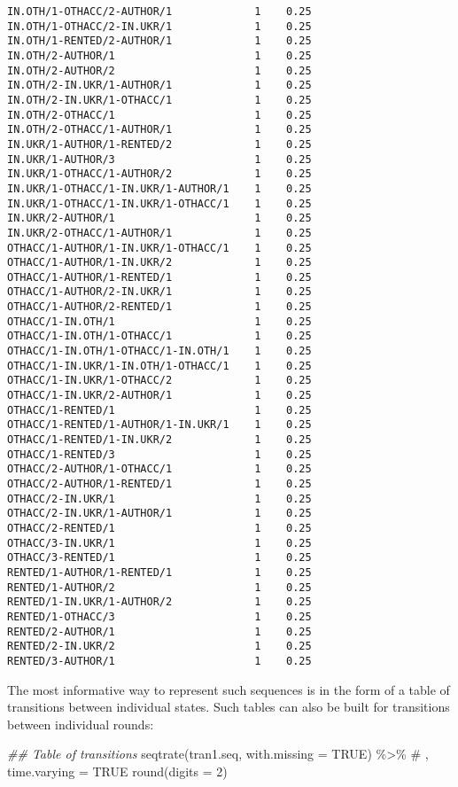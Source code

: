 \documentclass[
  letterpaper,
  DIV=11,
  numbers=noendperiod]{scrreprt}
\newenvironment{Shaded}{\begin{snugshade}}{\end{snugshade}}
\newcommand{\AttributeTok}[1]{\textcolor[rgb]{0.40,0.45,0.13}{#1}}
\newcommand{\CommentTok}[1]{\textcolor[rgb]{0.37,0.37,0.37}{#1}}
\newcommand{\ConstantTok}[1]{\textcolor[rgb]{0.56,0.35,0.01}{#1}}
\newcommand{\DecValTok}[1]{\textcolor[rgb]{0.68,0.00,0.00}{#1}}
\newcommand{\DocumentationTok}[1]{\textcolor[rgb]{0.37,0.37,0.37}{\textit{#1}}}
\newcommand{\FunctionTok}[1]{\textcolor[rgb]{0.28,0.35,0.67}{#1}}
\newcommand{\NormalTok}[1]{\textcolor[rgb]{0.00,0.23,0.31}{#1}}
\newcommand{\SpecialCharTok}[1]{\textcolor[rgb]{0.37,0.37,0.37}{#1}}
\begin{document}
\begin{verbatim}
IN.OTH/1-OTHACC/2-AUTHOR/1             1    0.25
IN.OTH/1-OTHACC/2-IN.UKR/1             1    0.25
IN.OTH/1-RENTED/2-AUTHOR/1             1    0.25
IN.OTH/2-AUTHOR/1                      1    0.25
IN.OTH/2-AUTHOR/2                      1    0.25
IN.OTH/2-IN.UKR/1-AUTHOR/1             1    0.25
IN.OTH/2-IN.UKR/1-OTHACC/1             1    0.25
IN.OTH/2-OTHACC/1                      1    0.25
IN.OTH/2-OTHACC/1-AUTHOR/1             1    0.25
IN.UKR/1-AUTHOR/1-RENTED/2             1    0.25
IN.UKR/1-AUTHOR/3                      1    0.25
IN.UKR/1-OTHACC/1-AUTHOR/2             1    0.25
IN.UKR/1-OTHACC/1-IN.UKR/1-AUTHOR/1    1    0.25
IN.UKR/1-OTHACC/1-IN.UKR/1-OTHACC/1    1    0.25
IN.UKR/2-AUTHOR/1                      1    0.25
IN.UKR/2-OTHACC/1-AUTHOR/1             1    0.25
OTHACC/1-AUTHOR/1-IN.UKR/1-OTHACC/1    1    0.25
OTHACC/1-AUTHOR/1-IN.UKR/2             1    0.25
OTHACC/1-AUTHOR/1-RENTED/1             1    0.25
OTHACC/1-AUTHOR/2-IN.UKR/1             1    0.25
OTHACC/1-AUTHOR/2-RENTED/1             1    0.25
OTHACC/1-IN.OTH/1                      1    0.25
OTHACC/1-IN.OTH/1-OTHACC/1             1    0.25
OTHACC/1-IN.OTH/1-OTHACC/1-IN.OTH/1    1    0.25
OTHACC/1-IN.UKR/1-IN.OTH/1-OTHACC/1    1    0.25
OTHACC/1-IN.UKR/1-OTHACC/2             1    0.25
OTHACC/1-IN.UKR/2-AUTHOR/1             1    0.25
OTHACC/1-RENTED/1                      1    0.25
OTHACC/1-RENTED/1-AUTHOR/1-IN.UKR/1    1    0.25
OTHACC/1-RENTED/1-IN.UKR/2             1    0.25
OTHACC/1-RENTED/3                      1    0.25
OTHACC/2-AUTHOR/1-OTHACC/1             1    0.25
OTHACC/2-AUTHOR/1-RENTED/1             1    0.25
OTHACC/2-IN.UKR/1                      1    0.25
OTHACC/2-IN.UKR/1-AUTHOR/1             1    0.25
OTHACC/2-RENTED/1                      1    0.25
OTHACC/3-IN.UKR/1                      1    0.25
OTHACC/3-RENTED/1                      1    0.25
RENTED/1-AUTHOR/1-RENTED/1             1    0.25
RENTED/1-AUTHOR/2                      1    0.25
RENTED/1-IN.UKR/1-AUTHOR/2             1    0.25
RENTED/1-OTHACC/3                      1    0.25
RENTED/2-AUTHOR/1                      1    0.25
RENTED/2-IN.UKR/2                      1    0.25
RENTED/3-AUTHOR/1                      1    0.25
\end{verbatim}

The most informative way to represent such sequences is in the form of a
table of transitions between individual states. Such tables can also be
built for transitions between individual rounds:

\begin{Shaded}
\begin{Highlighting}[]
\DocumentationTok{\#\# Table of transitions}
\FunctionTok{seqtrate}\NormalTok{(tran1.seq, }\AttributeTok{with.missing =} \ConstantTok{TRUE}\NormalTok{) }\SpecialCharTok{\%\textgreater{}\%}  \CommentTok{\# , time.varying = TRUE}
  \FunctionTok{round}\NormalTok{(}\AttributeTok{digits =} \DecValTok{2}\NormalTok{)}
\end{Highlighting}
\end{Shaded}
\end{document}
